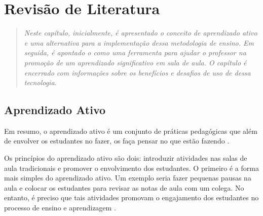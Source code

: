 \chapter{Revisão de Literatura}\label{chap:revision}

\begin{quote}\normalfont\itshape\vspace*{-2\baselineskip}
  Neste capítulo, inicialmente, é
  apresentado o conceito de aprendizado ativo e uma alternativa para a implementação dessa
  metodologia de ensino.
  Em seguida, é apontado o {\clicker} como uma
  ferramenta para ajudar o professor na promoção de um aprendizado significativo  em
  sala de aula. O capítulo é encerrado com informações sobre os benefícios e desafios de uso de dessa tecnologia.
\end{quote}


%


\section{Aprendizado Ativo}\label{section:aprendizado_ativo}


Em resumo, o aprendizado ativo é um conjunto de práticas pedagógicas
que além de envolver os estudantes no fazer, os faça pensar no que estão fazendo \cite[p. 19]{Charles1991}.

Os princípios do aprendizado ativo são dois: introduzir atividades nas salas de aula
tradicionais e promover o envolvimento dos estudantes. O primeiro é a forma
mais simples do aprendizado ativo. Um exemplo seria fazer pequenas pausas na aula
e colocar os estudantes para revisar as notas de aula com um colega. No entanto,
é preciso que tais atividades promovam o engajamento dos estudantes no processo
de ensino e aprendizagem \cite[p. 3]{Prince2004}.

